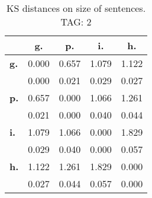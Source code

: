 \begin{table}[h!]
\begin{center}
\begin{tabular}{| l || c | c | c | c |}\hline
 & {\bf g.} & {\bf p.} & {\bf i.} & {\bf h.} \\\hline\hline
{\bf g.} & 0.000 & 0.657 & 1.079 & 1.122 \\
{\bf } & 0.000 & 0.021 & 0.029 & 0.027 \\\hline
{\bf p.} & 0.657 & 0.000 & 1.066 & 1.261 \\
{\bf } & 0.021 & 0.000 & 0.040 & 0.044 \\\hline
{\bf i.} & 1.079 & 1.066 & 0.000 & 1.829 \\
{\bf } & 0.029 & 0.040 & 0.000 & 0.057 \\\hline
{\bf h.} & 1.122 & 1.261 & 1.829 & 0.000 \\
{\bf } & 0.027 & 0.044 & 0.057 & 0.000 \\\hline
\end{tabular}
\caption{KS distances on size of sentences. TAG: 2}
\end{center}
\end{table}